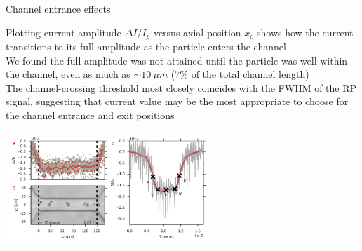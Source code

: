 \begin{frame}[c]{Channel entrance effects}
	
	{\scriptsize
		Plotting current amplitude $\Delta I/I_{p}$ versus axial position $x_{c}$ shows how the current transitions to its full amplitude as the particle enters the channel \\
		\vspace{.1in}
		We found the full amplitude was not attained until the particle was well-within the channel, even as much as $\sim\SI{10}{\mu m}$ ($7\%$ of the total channel length) \\
		\vspace{.1in}
		The channel-crossing threshold most closely coincides with the FWHM of the RP signal, suggesting that current value may be the most appropriate to choose for the channel entrance and exit positions \\
	}
	
	
	{\centering
		\includegraphics[width=3in]{channelentrancestraight.pdf} \\
		\par
	}
	

	
\end{frame}




